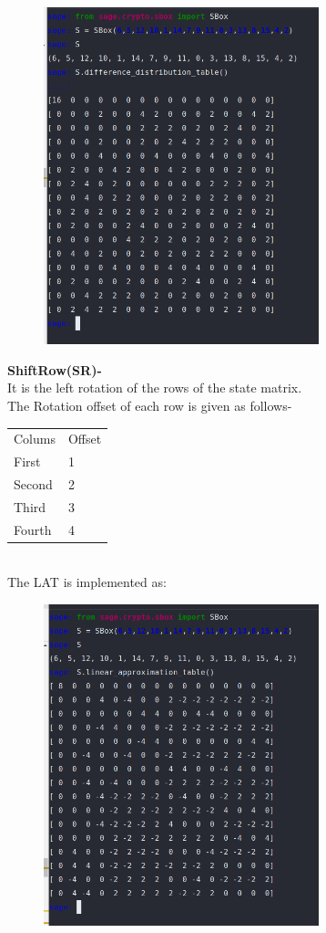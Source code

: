 \documentclass[journal=tosc,preprint]{iacrtrans}
\begin{document}
\begin{figure}[htp]
    \centering
    \includegraphics[width=8cm]{img_1.png}
\end{figure}
\textbf{ShiftRow(SR)-}\\
It is the left rotation of the rows of the state matrix.\\
The Rotation offset of each row is given as follows-
\begin{table}[]
\begin{tabular}{ll}
Colums & Offset \\
First  & 1      \\
Second & 2      \\
Third  & 3      \\
Fourth & 4     
\end{tabular}
\end{table}\\

\vspace{10cm}
The LAT is implemented as:

\begin{figure}[htp]
    \centering
    \includegraphics[width=8cm]{img_2.png}
\end{figure}
\end{document}
